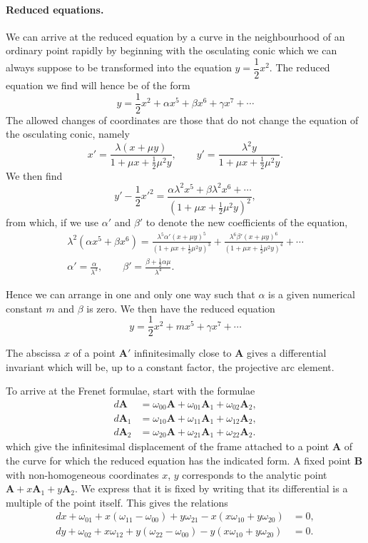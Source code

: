 \documentclass[leqno,11pt]{book}
\numberwithin{equation}{chapter}
\theoremstyle{shape1}
\theoremstyle{shapesmall}
\begin{document}
\paragraph{Reduced equations.}
\label{sec:151}
We can arrive at the reduced equation by a curve in the neighbourhood of an ordinary point rapidly by beginning with the osculating conic which we can always suppose to be transformed into the equation $y=\dfrac{1}{2}x^{2}$. The reduced equation we find will hence be of the form
\[
y=\frac{1}{2}x^{2}+\alpha x^{5}+\beta x^{6}+\gamma x^{7}+\cdots
\]
The allowed changes of coordinates are those that do not change the equation of the osculating conic, namely
\[
x'=\frac{\lambda(x+\mu y)}{1+\mu x+\frac{1}{2}\mu^{2}y},\qquad y'=\frac{\lambda^{2}y}{1+\mu x+\frac{1}{2}\mu^{2}y}.
\]
We then find
\[
y'-\frac{1}{2}x'^{2}=\frac{\alpha\lambda^{2}x^{5}+\beta\lambda^{2}x^{6}+\cdots}{(1+\mu x+\frac{1}{2}\mu^{2}y)^{2}},
\]
from which, if we use $\alpha'$ and $\beta'$ to denote the new coefficients of the equation,
\begin{gather*}
  \lambda^{2}(\alpha x^{5}+\beta x^{6})=
  \frac{\lambda^{5}\alpha'(x+\mu y)^{5}}{(1+\mu x+\frac{1}{2}\mu^{2}y)^{3}}+
  \frac{\lambda^{6}\beta'(x+\mu y)^{6}}{(1+\mu x+\frac{1}{2}\mu^{2}y)^{4}}+\cdots
  \\
  \alpha'=\frac{\alpha}{\lambda^{3}},\qquad\beta'=\frac{\beta+\frac{1}{2}\alpha\mu}{\lambda^{4}}.
\end{gather*}

Hence we can arrange in one and only one way such that $\alpha$ is a given numerical constant $m$ and $\beta$ is zero. We then have the reduced equation
\[
y=\frac{1}{2}x^{2}+m x^{5}+\gamma x^{7}+\cdots
\]

The abscissa $x$ of a point $\mathbf{A}'$ infinitesimally close to $\mathbf{A}$ gives a differential invariant which will be, up to a constant factor, the projective arc element.

To arrive at the Frenet formulae, start with the formulae
\begin{align*}
  d\mathbf{A}_{\phantom{0}}&=\omega_{00}\mathbf{A}+\omega_{01}\mathbf{A}_{1}+\omega_{02}\mathbf{A}_{2},\\
  d\mathbf{A}_{{1}}&=\omega_{10}\mathbf{A}+\omega_{11}\mathbf{A}_{1}+\omega_{12}\mathbf{A}_{2},\\
  d\mathbf{A}_{{2}}&=\omega_{20}\mathbf{A}+\omega_{21}\mathbf{A}_{1}+\omega_{22}\mathbf{A}_{2}.
\end{align*}
which give the infinitesimal displacement of the frame attached to a point $\mathbf{A}$ of the curve for which the reduced equation has the indicated form. A fixed point $\mathbf{B}$ with non-homogeneous coordinates $x$, $y$ corresponds to the analytic point $\mathbf{A}+x\mathbf{A}_{1}+y\mathbf{A}_{2}$. We express that it is fixed by writing that its differential is a multiple of the point itself. This gives the relations
\begin{align*}
  dx+\omega_{01}+x(\omega_{11}-\omega_{00})+y\omega_{21}-x(x\omega_{10}+y\omega_{20})&=0,\\
  dy+\omega_{02}+x \omega_{12}+y(\omega_{22}-\omega_{00})-y(x\omega_{10}+y\omega_{20})&=0.
\end{align*}
\end{document}
